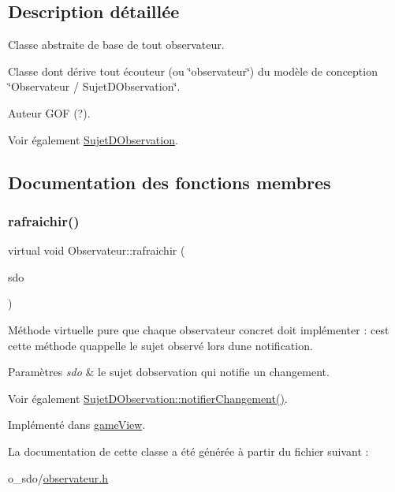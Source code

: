 \subsection{Description détaillée}
Classe abstraite de base de tout observateur. 

Classe dont dérive tout écouteur (ou \char`\"{}observateur\char`\"{}) du modèle de conception \char`\"{}\+Observateur / Sujet\+D\+Observation\char`\"{}.

\begin{DoxyAuthor}{Auteur}
G\+OF (?). 
\end{DoxyAuthor}
\begin{DoxySeeAlso}{Voir également}
\mbox{\hyperlink{class_sujet_d_observation}{Sujet\+D\+Observation}}. 
\end{DoxySeeAlso}


\subsection{Documentation des fonctions membres}
\mbox{\label{class_observateur_a4fcbecba73ee923d201246207b8470ce}} 
\subsubsection{\texorpdfstring{rafraichir()}{rafraichir()}}
{\footnotesize\ttfamily virtual void Observateur\+::rafraichir (\begin{DoxyParamCaption}\item[{\mbox{\hyperlink{class_sujet_d_observation}{Sujet\+D\+Observation}} $\ast$}]{sdo }\end{DoxyParamCaption})\hspace{0.3cm}{\ttfamily [pure virtual]}}



Méthode virtuelle pure que chaque observateur concret doit implémenter \+: c\textquotesingle{}est cette méthode qu\textquotesingle{}appelle le sujet observé lors d\textquotesingle{}une notification. 


\begin{DoxyParams}{Paramètres}
{\em sdo} & le sujet d\textquotesingle{}observation qui notifie un changement. \\
\hline
\end{DoxyParams}
\begin{DoxySeeAlso}{Voir également}
\mbox{\hyperlink{class_sujet_d_observation_ab4a833d911377a2dd3c83ce8ce3ac540}{Sujet\+D\+Observation\+::notifier\+Changement()}}. 
\end{DoxySeeAlso}


Implémenté dans \mbox{\hyperlink{classgame_view_a027b8c569f2861ac7633e859eadfae59}{game\+View}}.



La documentation de cette classe a été générée à partir du fichier suivant \+:\begin{DoxyCompactItemize}
\item 
o\+\_\+sdo/\mbox{\hyperlink{observateur_8h}{observateur.\+h}}\end{DoxyCompactItemize}
